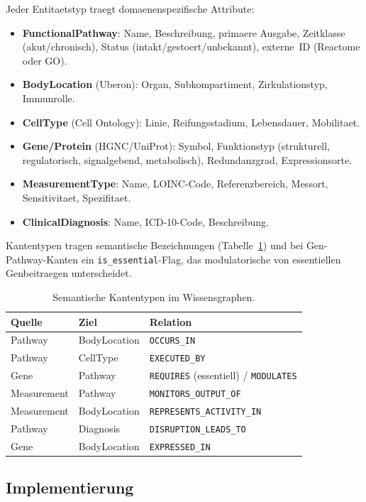 \documentclass[12pt,a4paper]{article}
\begin{document}
Jeder Entitaetstyp traegt domaenenspezifische Attribute:

\begin{itemize}
    \item \textbf{FunctionalPathway}: Name, Beschreibung, primaere Ausgabe, Zeitklasse (akut/chronisch), Status (intakt/gestoert/unbekannt), externe~ID (Reactome oder GO).
    \item \textbf{BodyLocation} (Uberon): Organ, Subkompartiment, Zirkulationstyp, Immunrolle.
    \item \textbf{CellType} (Cell Ontology): Linie, Reifungsstadium, Lebensdauer, Mobilitaet.
    \item \textbf{Gene/Protein} (HGNC/UniProt): Symbol, Funktionstyp (strukturell, regulatorisch, signalgebend, metabolisch), Redundanzgrad, Expressionsorte.
    \item \textbf{MeasurementType}: Name, LOINC-Code, Referenzbereich, Messort, Sensitivitaet, Spezifitaet.
    \item \textbf{ClinicalDiagnosis}: Name, ICD-10-Code, Beschreibung.
\end{itemize}

Kantentypen tragen semantische Bezeichnungen (Tabelle~\ref{tab:edges}) und bei Gen-Pathway-Kanten ein \texttt{is\_essential}-Flag, das modulatorische von essentiellen Genbeitraegen unterscheidet.

\begin{table}[H]
\centering
\caption{Semantische Kantentypen im Wissensgraphen.}
\label{tab:edges}
\begin{tabular}{lll}
\toprule
\textbf{Quelle} & \textbf{Ziel} & \textbf{Relation} \\
\midrule
Pathway & BodyLocation & \texttt{OCCURS\_IN} \\
Pathway & CellType & \texttt{EXECUTED\_BY} \\
Gene & Pathway & \texttt{REQUIRES} (essentiell) / \texttt{MODULATES} \\
Measurement & Pathway & \texttt{MONITORS\_OUTPUT\_OF} \\
Measurement & BodyLocation & \texttt{REPRESENTS\_ACTIVITY\_IN} \\
Pathway & Diagnosis & \texttt{DISRUPTION\_LEADS\_TO} \\
Gene & BodyLocation & \texttt{EXPRESSED\_IN} \\
\bottomrule
\end{tabular}
\end{table}

\subsection{Implementierung}
\label{sec:implementation}
\end{document}
